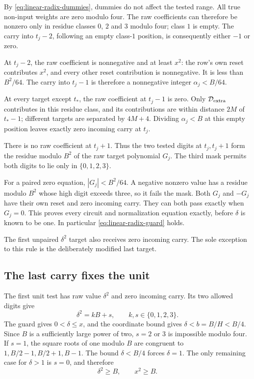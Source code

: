 By \eqref{eq:linear-radix-dummies}, dummies do not affect the
tested range. All true non-input weights are zero modulo four.
The raw coefficients can therefore be nonzero only in residue
classes $0$, $2$ and $3$ modulo four; class $1$ is empty. The
carry into $t_j-2$, following an empty class-$1$ position, is
consequently either $-1$ or zero.

At $t_j-2$, the raw coefficient is nonnegative and at least
$x^2$: the row's own reset contributes $x^2$, and every other
reset contribution is nonnegative. It is less than $B^2/64$.
The carry into $t_j-1$ is therefore a nonnegative integer
$\alpha_j<B/64$.

At every target except $t_*$, the raw coefficient at $t_j-1$
is zero. Only $\mathcal D_{\rm extra}$ contributes in this
residue class, and its contributions are within distance $2M$
of $t_*-1$; different targets are separated by $4M+4$.
Dividing $\alpha_j<B$ at this empty position leaves exactly
zero incoming carry at $t_j$.

There is no raw coefficient at $t_j+1$. Thus the two tested
digits at $t_j,t_j+1$ form the residue modulo $B^2$ of the raw
target polynomial $G_j$. The third mask permits both digits
to lie only in $\{0,1,2,3\}$.

For a paired zero equation, $|G_j|<B^2/64$. A negative nonzero
value has a residue modulo $B^2$ whose high digit exceeds three,
so it fails the mask. Both $G_j$ and $-G_j$ have their own
reset and zero incoming carry. They can both pass exactly when
$G_j=0$. This proves every circuit and normalization equation
exactly, before $\delta$ is known to be one. In particular
\eqref{eq:linear-radix-guard} holds.

The first unpaired $\delta^2$ target also receives zero incoming
carry. The sole exception to this rule is the deliberately
modified last target.

\subsection{The last carry fixes the unit}

The first unit test has raw value $\delta^2$ and zero incoming
carry. Its two allowed digits give
\begin{equation}\label{eq:linear-radix-unit-digits}
 \delta^2=kB+s,\qquad k,s\in\{0,1,2,3\}.
\end{equation}
The guard gives $0<\delta\le x$, and the coordinate bound gives
$\delta<b=B/H<B/4$. Since $B$ is a sufficiently large power
of two, $s=2$ or $3$ is impossible modulo four. If $s=1$, the
square roots of one modulo $B$ are congruent to
$1,B/2-1,B/2+1,B-1$. The bound $\delta<B/4$ forces
$\delta=1$. The only remaining case for $\delta>1$ is $s=0$,
and therefore
\begin{equation}\label{eq:linear-radix-large-unit}
 \delta^2\ge B,\qquad x^2\ge B.
\end{equation}

